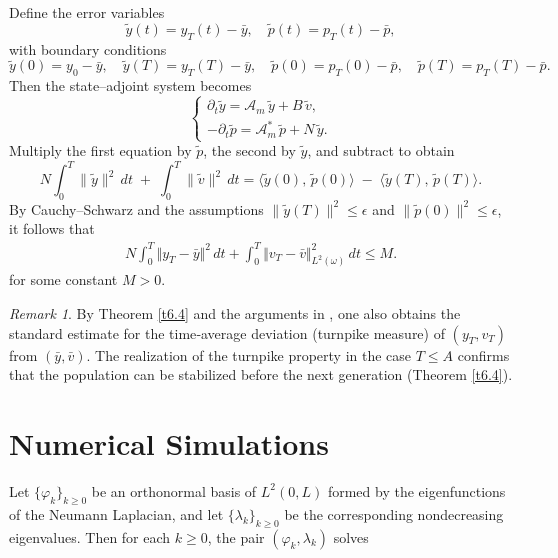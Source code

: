 \documentclass[10pt, a4]{amsart}
\makeatletter
\newcounter{assu}
\theoremstyle{plain}
\theoremstyle{definition}
\theoremstyle{remark}
\newtheorem{remark}[lemma]{Remark}
\renewenvironment{proof}[1][\proofname]{\par
  \pushQED{\qed}%
  \normalfont \topsep6\p@\@plus6\p@\relax
  \trivlist
  \item[\hskip\labelsep
        \itshape
    #1\ \ref{#1}.]\ignorespaces
}{%
  \popQED\endtrivlist\@endpefalse
}
\numberwithin{equation}{section}
\makeatother
\begin{document}
\begin{proof}[of Theorem \ref{t6.4}]
Define the error variables
\[
\tilde y(t) = y_T(t) - \bar y,
\quad
\tilde p(t) = p_T(t) - \bar p,
\]
with boundary conditions
\[
\tilde y(0)=y_0-\bar y,\quad
\tilde y(T)=y_T(T)-\bar y,
\quad
\tilde p(0)=p_T(0)-\bar p,\quad
\tilde p(T)=p_T(T)-\bar p.
\]
Then the state–adjoint system becomes
\begin{equation}\label{err-sys}
\begin{cases}
\partial_t\tilde y = \mathcal A_m\,\tilde y + B\,\tilde v,\\[4pt]
-\partial_t\tilde p = \mathcal A_m^*\,\tilde p + N\,\tilde y.
\end{cases}
\end{equation}
Multiply the first equation by \(\tilde p\), the second by \(\tilde y\), and subtract to obtain
\[
N\int_0^T \|\tilde y\|^2\,dt
\;+\;
\int_0^T \|\tilde v\|^2\,dt
=
\langle \tilde y(0),\,\tilde p(0)\rangle
\;-\;
\langle \tilde y(T),\,\tilde p(T)\rangle.
\]
By Cauchy–Schwarz and the assumptions
\(\|\tilde y(T)\|^2 \le \epsilon\) and \(\|\tilde p(0)\|^2 \le \epsilon\), it follows that
\begin{align}
    N\int_0^T\Vert y_T-\bar{y}\Vert^2\,dt+\displaystyle\int_0^T\Vert v_T-\bar{v}\Vert^2_{L^2(\omega)}\,dt  \leq M.
\end{align}
for some constant \(M>0\). %
\end{proof}

\begin{remark}
By Theorem \ref{t6.4} and the arguments in \cite{ref54}, one also obtains the standard estimate for the time‑average deviation (turnpike measure) of \((y_T,v_T)\) from \((\bar y,\bar v)\). The realization of the turnpike property in the case $T \leq A$ confirms that the population can be stabilized before the next generation (Theorem \ref{t6.4}).
\end{remark}

\section{Numerical Simulations}\label{s7}%
 Let $\{\varphi_k\}_{k\ge0}$ be an orthonormal basis of $L^2(0,L)$ formed by the eigenfunctions of the Neumann Laplacian, and let $\{\lambda_k\}_{k\ge0}$ be the corresponding nondecreasing eigenvalues.  Then for each $k\ge0$, the pair $(\varphi_k,\lambda_k)$ solves
\end{document}
